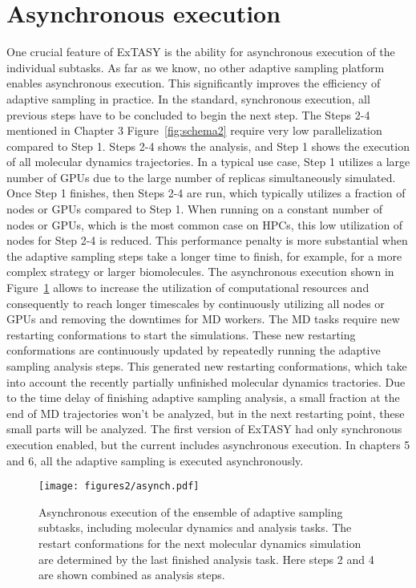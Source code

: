{\section{\label{sec:asynch}Asynchronous execution}

One crucial feature of ExTASY is the ability for asynchronous execution of the individual subtasks. As far as we know, no other adaptive sampling platform enables asynchronous execution. This significantly improves the efficiency of adaptive sampling in practice. In the standard, synchronous execution, all previous steps have to be concluded to begin the next step. 
The Steps 2-4 mentioned in Chapter 3 Figure~\ref{fig:schema2} require very low parallelization compared to Step 1. Steps 2-4 shows the analysis, and Step 1 shows the execution of all molecular dynamics trajectories. In a typical use case, Step 1 utilizes a large number of GPUs due to the large number of replicas simultaneously simulated. Once Step 1 finishes, then Steps 2-4 are run, which typically utilizes a fraction of nodes or GPUs compared to Step 1. When running on a constant number of nodes or GPUs, which is the most common case on HPCs, this low utilization of nodes for Step 2-4 is reduced. This performance penalty is more substantial when the adaptive sampling steps take a longer time to finish, for example, for a more complex strategy or larger biomolecules. The asynchronous execution shown in Figure~\ref{fig:asynch} allows to increase the utilization of computational resources and consequently to reach longer timescales by continuously utilizing all nodes or GPUs and removing the downtimes for MD workers. The MD tasks require new restarting conformations to start the simulations. These new restarting conformations are continuously updated by repeatedly running the adaptive sampling analysis steps. This generated new restarting conformations, which take into account the recently partially unfinished molecular dynamics tractories. Due to the time delay of finishing adaptive sampling analysis, a small fraction at the end of MD trajectories won't be analyzed, but in the next restarting point, these small parts will be analyzed.
The first version of ExTASY\cite{Extasy2016} had only synchronous execution enabled, but the current \cite{Extasy2019} includes asynchronous execution. In chapters 5 and 6, all the adaptive sampling is executed asynchronously. 

\begin{figure}[h]
  \centering
  \texttt{[image: figures2/asynch.pdf]}
  \caption{Asynchronous execution of the ensemble of adaptive sampling subtasks, including molecular dynamics and analysis tasks. The restart conformations for the next molecular dynamics simulation are determined by the last finished analysis task. Here steps 2 and 4 are shown combined as analysis steps.}
  \label{fig:asynch}
\end{figure}



}
